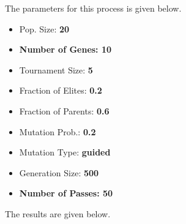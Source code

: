 \documentclass[3p,times,procedia]{elsarticle}
\begin{document}
The parameters for this process is given below.
\begin{multicols}{3}
    \begin{itemize}
    \item Pop. Size: \textbf{20}
    \item \textbf{Number of Genes: \textbf{10}}
    \item Tournament Size: \textbf{5}  
    \item Fraction of Elites: \textbf{0.2}
    \item Fraction of Parents: \textbf{0.6}
    \item Mutation Prob.: \textbf{0.2}
    \item Mutation Type: \textbf{guided}
    \item Generation Size: \textbf{500}
    \item \textbf{Number of Passes: 50}
    \end{itemize}
\end{multicols}

The results are given below.
\end{document}
